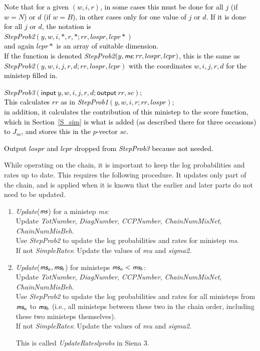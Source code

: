 \documentclass[a4paper,12pt,fleqn]{article}
\newcommand{\ms}{\textsl{\textsf{\small ms}}} %
\newcommand{\adda}[1]{{#1}}  %
\newcommand{\addaa}[1]{{\textcolor[named]{Black}{#1}}}  %
\newcommand{\addcd}[1]{{\textcolor[named]{Black}{#1}}}
\begin{document}
\begin{enumerate}
      \addaa{Note that for a given $(w,i,r)$, in some cases this must be done for all $j$ (if $w=N$)
      or $d$ (if $w=B$), in other cases only for one value of $j$ or $d$.
      If it is done for all $j$ or $d$, the notation is\\
      \textit{StepProb2}$(y, w,i,*,r,*; rr, lospr, lcpr*)$\\
       and again $lcpr*$ is an array
      of suitable dimension.\\
      If the function is denoted \textit{StepProb2}$(y, \ms; rr, lospr, lcpr)$, this is the same as
      \textit{StepProb2}$(y, w,i,j,r,d; rr, lospr, lcpr)$ with the coordinates $w,i,j,r,d$
      for the ministep filled in.
\item \textit{StepProb3}$(\textsf{input}\ y, w,i,j,r,d; \textsf{output}\  rr, sc)$;\\
      This calculates $rr$ as in
      \textit{StepProb1}$(y, w,i,r; rr, lospr)$;\\
      in addition,  it calculates the contribution of this ministep to the
      score function, which in Section~\ref{S_sim}
      is what is added (as described there for three occasions) to $J_m$,
      and stores this in the $p$-vector $sc$.}
      \addcd{Output $lospr$ and $lcpr$ dropped from \textit{StepProb3} because not needed.}
\end{enumerate}

While operating on the chain, it is important to keep the
log probabilities and rates up to date. This requires the following procedure.
It updates only part of the chain, and is applied when it is known
that the earlier and later parts do not need to be updated.

\begin{enumerate}[resume]
\item \adda{
       \textit{Update}($\ms$) for a ministep \ms:\\
       Update \textit{TotNumber},  \textit{DiagNumber}, \textit{CCPNumber}, \textit{ChainNumMisNet},\\
       \textit{ChainNumMisBeh}.\\
       Use \textit{StepProb2} to update the log probabilities and rates for ministep \ms .\\
       If not \textit{SimpleRates}:
       Update the values of \textit{mu} and \textit{sigma2}.
       }
\item \textit{Update}($\ms_a, \ms_b$) for ministeps $\ms_a < \ms_b$:\\
       Update \textit{TotNumber},  \textit{DiagNumber}, \textit{CCPNumber}, \textit{ChainNumMisNet},\\
       \textit{ChainNumMisBeh}.\\
       Use \textit{StepProb2} to update the log probabilities and rates for all ministeps
       from $\ms_a$ to $\ms_b$ (i.e., all ministeps between these two in the chain order,
       including these two ministeps themselves).\\
       If not \textit{SimpleRates}:
       Update the values of \textit{mu} and \textit{sigma2}.

       This is called \textit{UpdateRateslprobs} in Siena 3.
\end{enumerate}
\end{document}
